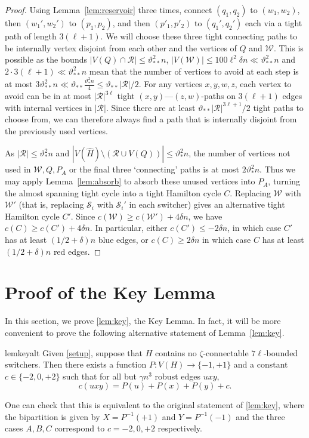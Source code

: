\documentclass[A4paper,12pt]{article}
\theoremstyle{definition}
\begin{document}
\begin{proof}[Proof]
     Using Lemma~\ref{lem:reservoir} three times, connect $(q_1,q_2)$ to $(w_1,w_2)$, then $(w_1',w_2')$ to $(p_1,p_2)$, and then $(p'_1,p'_2)$ to $(q_1',q_2')$ each via a tight path of length $3(\ell +1)$. 
     We will choose these three tight connecting paths to be internally vertex disjoint from each other and the vertices of $Q$ and $\mathcal{W}$. This is possible as the bounds $|V(Q) \cap \mathcal{R}| \leq \vartheta_{**}^2 n $, $|V(\mathcal{W})| \leq 100\ell^2 \delta  n \ll \vartheta_{**}^2 n$ and $2\cdot 3(\ell+1) \ll  \vartheta_{**}^2 n$ mean that the number of vertices to avoid at each step is at most $ 3\vartheta_{**}^2 n \ll \vartheta_{**}\frac{\vartheta^2_{*} n}{4} \le \vartheta_{**}|\mathcal{R}|/2$. 
     For any vertices $x,y,w,z$, each vertex to avoid can be in at most $|\mathcal{R}|^{3\ell}$ tight $(x,y)$---$(z,w)$-paths on $3(\ell+1)$ edges with internal vertices in $|\mathcal{R}|$. Since there are at least $\vartheta_{**} |\mathcal{R}|^{3\ell+1}/2$ tight paths to choose from, we can therefore always find a path that is internally disjoint from the previously used vertices.
     
     As $|\mathcal{R}| \leq \vartheta_{*}^2 n$ and $|V(\hat{H})\setminus (\mathcal{R} \cup V(Q))| \le \vartheta_{*}^2 n$, the number of vertices not used in $\mathcal{W},Q,P_A$ or the final three `connecting' paths is at most $2\vartheta_{*}^2 n$.
     Thus we may apply Lemma~\ref{lem:absorb} to absorb these unused vertices into $P_A$, turning the almost spanning tight cycle into a tight Hamilton cycle $C$. Replacing $\mathcal{W}$ with $\mathcal{W}'$ (that is, replacing $\mathcal{S}_i$ with $\mathcal{S}_i'$ in each switcher) gives an alternative tight Hamilton cycle $C'$. Since $c(\mathcal{W}) \geq c(\mathcal{W}') + 4\delta n$, we have $c(C) \ge c(C') + 4 \delta n$. In particular, either  $c(C') \le - 2\delta n$, in which case $C'$ has at least $(1/2 + \delta)n$ blue edges, or $c(C) \ge 2\delta n$ in which case $C$ has at least $(1/2 + \delta)n$ red edges.
\end{proof}


\section{Proof of the Key Lemma}\label{sec:key_lemma}
In this section, we prove \cref{lem:key}, the Key Lemma.
In fact, it will be more convenient to prove the following alternative statement of Lemma~\ref{lem:key}.
\begin{restatable}{lem}{keyalt}
\label{lem:key_lemma_alternative}
       Given \cref{setup},  
      suppose that $H$ contains no $\zeta$-connectable $7\ell$-bounded switchers. Then there exists a function $P:V(H) \rightarrow \{-1,+1\}$ and a constant $c \in \{-2,0,+2\}$ such that
      for all but $\gamma n^3$ robust edges $uxy$,
      \[c(uxy) = P(u) + P(x) + P(y) + c.\]
\end{restatable}
One can check that this is equivalent to the original statement of \cref{lem:key}, where the bipartition is given by $X = P^{-1}(+1)$ and $Y= P^{-1}(-1)$ and the three cases $A,B,C$ correspond to $c = -2,0,+2$ respectively.
\end{document}
